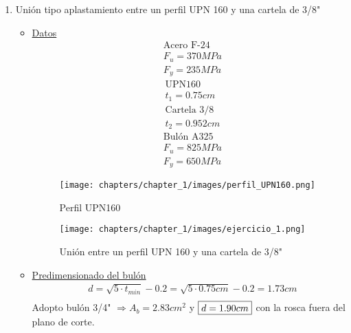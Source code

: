 \begin{enumerate}
\item Unión tipo aplastamiento entre un perfil UPN 160 y una cartela de 3/8"
\begin{itemize}
\item \underline{Datos}
\begin{align*}
& \text{Acero F-24}\\
& F_u = 370MPa\\
& F_y = 235MPa
\end{align*}
\begin{align*}
& \text{UPN160}\\
& t_1 = 0.75 cm\\
& \text{Cartela 3/8}\\
& t_2 = 0.952 cm
\end{align*}
\begin{align*}
& \text{Bulón A325}\\
& F_u = 825MPa\\
& F_y = 650MPa
\end{align*}

\begin{figure}[H]
\begin{center}
     \texttt{[image: chapters/chapter\_1/images/perfil\_UPN160.png]}
\end{center}
\caption{Perfil UPN160}
\end{figure}

\begin{figure}[H]
\begin{center}
     \texttt{[image: chapters/chapter\_1/images/ejercicio\_1.png]}
\end{center}
\caption{Unión entre un perfil UPN 160 y una cartela de 3/8"}
\end{figure}


\item \underline{Predimensionado del bulón}
\begin{align*}
& d = \sqrt{5 \cdot t_{min}} - 0.2 = \sqrt{5 \cdot 0.75 cm} - 0.2 = 1.73cm\\
\end{align*}
Adopto bulón 3/4" $\Rightarrow A_b = 2.83 cm^2$ y $\framebox{$d = 1.90 cm$}$ con la rosca fuera del plano de corte.


\end{itemize}
\end{enumerate}
